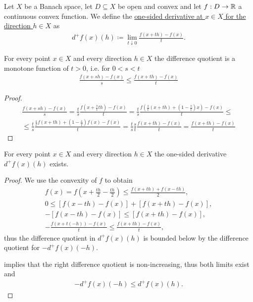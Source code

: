 \begin{definition}
  Let $X$ be a Banach space, let $D \subseteq X$ be open and convex and let $f: D \to \mathbb{R}$ a continuous convex function. We define the \uline{one-sided derivative at $x \in X$ for the direction $h \in X$} as
  \begin{align*}
    d^+ f(x)(h) \coloneqq \lim_{t \downarrow 0} \frac {f(x + th) - f(x)} t.
  \end{align*}
\end{definition}

\begin{lemma}
  \label{thm:analysis:convex:difference-quotient-grows}
  For every point $x \in X$ and every direction $h \in X$ the difference quotient is a monotone function of $t > 0$, i.e. for $0 < s < t$
  \begin{align*}
    \frac {f(x + sh) - f(x)} s
    \leq
    \frac {f(x + th) - f(x)} t
  \end{align*}
\end{lemma}
\begin{proof}
  \begin{align*}
    \frac {f(x + sh) - f(x)} s
    =
    \frac t s \frac {f(x + \frac s t t h) - f(x)} t
    =
    \frac t s \frac {f\left(\frac s t (x + th) + (1 - \frac s t) x \right) - f(x)} t
    \leq \\ \leq
    \frac t s \frac {\frac s t f(x + t h) + (1 - \frac s t) f(x) - f(x)} t
    =
    \frac t s \frac s t \frac {f(x + th) - f(x)} t
    =
    \frac {f(x + th) - f(x)} t
  \end{align*}
\end{proof}

\begin{proposition}
  \label{thm:analysis:convex:one-sided-derivatives-exist}
  For every point $x \in X$ and every direction $h \in X$ the one-sided derivative $d^+ f(x)(h)$ exists.
\end{proposition}
\begin{proof}
  We use the convexity of $f$ to obtain
  \begin{align*}
    f(x) = f \left(x + \frac {th} 2 - \frac {th} 2 \right) \leq \frac {f(x + th) + f(x - th)} 2,
    \\
    0 \leq [f(x - th) - f(x)] + [f(x + th) - f(x)],
    \\
    -[f(x - th) - f(x)] \leq [f(x + th) - f(x)],
    \\
    -\frac {f(x + t(-h)) - f(x)} t \leq \frac {f(x + th) - f(x)} t,
  \end{align*}
  thus the difference quotient in $d^+ f(x)(h)$ is bounded below by the difference quotient for $-d^+ f(x)(-h)$.

   implies that the right difference quotient is non-increasing, thus both limits exist and
  \begin{align*}
    -d^+ f(x)(-h) \leq d^+ f(x)(h).
  \end{align*}
\end{proof}

